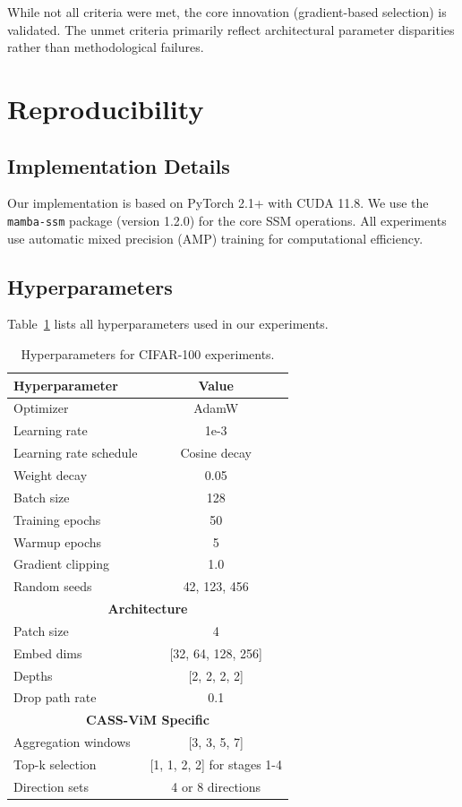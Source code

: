 \documentclass{article}
\begin{document}
While not all criteria were met, the core innovation (gradient-based selection) is validated. The unmet criteria primarily reflect architectural parameter disparities rather than methodological failures.

\section{Reproducibility}
\label{sec:reproducibility}

\subsection{Implementation Details}

Our implementation is based on PyTorch 2.1+ with CUDA 11.8. We use the \texttt{mamba-ssm} package (version 1.2.0) for the core SSM operations. All experiments use automatic mixed precision (AMP) training for computational efficiency.

\subsection{Hyperparameters}

Table~\ref{tab:hyperparams} lists all hyperparameters used in our experiments.

\begin{table}[t]
\caption{Hyperparameters for CIFAR-100 experiments.}
\label{tab:hyperparams}
\centering
\begin{tabular}{lc}
\toprule
Hyperparameter & Value \\
\midrule
Optimizer & AdamW \\
Learning rate & 1e-3 \\
Learning rate schedule & Cosine decay \\
Weight decay & 0.05 \\
Batch size & 128 \\
Training epochs & 50 \\
Warmup epochs & 5 \\
Gradient clipping & 1.0 \\
Random seeds & 42, 123, 456 \\
\midrule
\multicolumn{2}{c}{\textbf{Architecture}} \\
\midrule
Patch size & 4 \\
Embed dims & [32, 64, 128, 256] \\
Depths & [2, 2, 2, 2] \\
Drop path rate & 0.1 \\
\midrule
\multicolumn{2}{c}{\textbf{CASS-ViM Specific}} \\
\midrule
Aggregation windows & [3, 3, 5, 7] \\
Top-k selection & [1, 1, 2, 2] for stages 1-4 \\
Direction sets & 4 or 8 directions \\
\bottomrule
\end{tabular}
\end{table}
\end{document}
